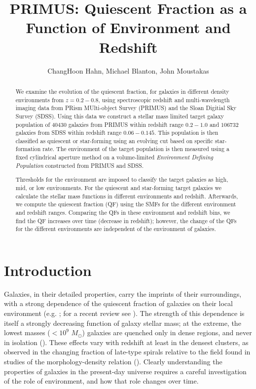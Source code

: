 \documentclass{emulateapj}
\begin{document}
\title{PRIMUS: Quiescent Fraction as a Function of Environment and Redshift}
\author{ChangHoon Hahn, Michael Blanton, John Moustakas}

\begin{abstract}
We examine the evolution of the quiescent fraction, for galaxies in 
different density environments from $z=0.2-0.8$, using spectroscopic 
redshift and multi-wavelength imaging data from PRism MUlti-object 
Survey (PRIMUS) and the Sloan Digitial Sky Survey (SDSS). Using this 
data we construct a stellar mass limited target galaxy population of 
$40430$ galaxies from PRIMUS within redshift range $0.2-1.0$ and $106732$
galaxies from SDSS within redshift range $0.06-0.145$. This population 
is then classified as quiescent or star-forming using an evolving cut 
based on specific star-formation rate. The environment of the target 
population is then measured using a fixed cylindrical aperture method 
on a volume-limited {\em Environment Defining Population} constructed
from PRIMUS and SDSS.

Thresholds for the environment are imposed to classify the target galaxies as
high, mid, or low environments. For the quiescent and star-forming 
target galaxies we calculate the stellar mass functions in different environments and redshift.
Afterwards, we compute the quiescent fraction (QF) using the SMFs for the different environment 
and redshift ranges.  Comparing the QFs in these environment and redshift bins, we find the 
QF increases over time (decrease in redshift); however, the change of 
the QFs for the different environments are independent of the 
environment of galaxies. 
\end{abstract}

\section{Introduction}
Galaxies, in their detailed properties, carry the imprints of their
surroundings, with a strong dependence of the quiescent fraction of
galaxies on their local environment (e.g. \citealt{hubble36a,
oemler74a, dressler80a, hermit96a, guzzo97a}; for a recent review see
\citealt{blanton09a}).  The strength of this dependence is itself a
strongly decreasing function of galaxy stellar mass; at the extreme,
the lowest masses ($<10^{9}$ $M_\odot$) galaxies are quenched only in
dense regions, and never in isolation (\citealt{geha12a}).  These
effects vary with redshift at least in the densest clusters, as
observed in the changing fraction of late-type spirals relative to the
field found in studies of the morphology-density relation
(\citealt{dressler84a, desai07a}).  Clearly understanding the
properties of galaxies in the present-day universe requires a careful
investigation of the role of environment, and how that role changes
over time.
\end{document}
